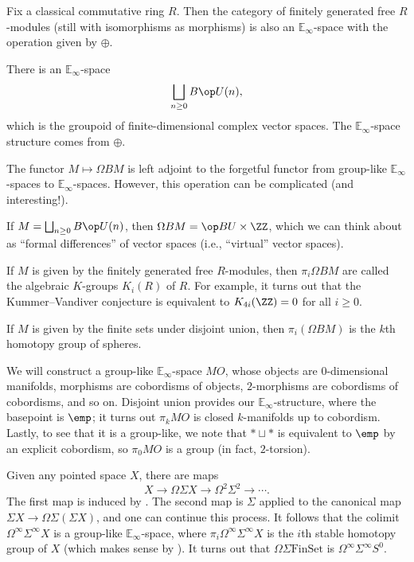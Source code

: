 \documentclass[../notes.tex]{subfiles}
\begin{document}
\begin{example}
	Fix a classical commutative ring $R$. Then the category of finitely generated free $R$-mod\-ules (still with isomorphisms as morphisms) is also an $\mathbb E_\infty$-space with the operation given by $\oplus$.
\end{example}
\begin{example}
	There is an $\mathbb E_\infty$-space
	\[\bigsqcup_{n\ge0}B\op U(n),\]
	which is the groupoid of finite-dimensional complex vector spaces. The $\mathbb E_\infty$-space structure comes from $\oplus$.
\end{example}
\begin{remark}
	The functor $M\mapsto\Omega BM$ is left adjoint to the forgetful functor from group-like $\mathbb E_\infty$-spaces to $\mathbb E_\infty$-spaces. However, this operation can be complicated (and interesting!).
\end{remark}
\begin{example}
	If $M=\bigsqcup_{n\ge0}B\op U(n)$, then $\Omega BM=\op BU\times\ZZ$, which we can think about as ``formal differences'' of vector spaces (i.e., ``virtual'' vector spaces).
\end{example}
\begin{example}
	If $M$ is given by the finitely generated free $R$-modules, then $\pi_i\Omega BM$ are called the algebraic $K$-groups $K_i(R)$ of $R$. For example, it turns out that the Kummer--Vandiver conjecture is equivalent to $K_{4i}(\ZZ)=0$ for all $i\ge0$.
\end{example}
\begin{example}
	If $M$ is given by the finite sets under disjoint union, then $\pi_i(\Omega BM)$ is the $k$th homotopy group of spheres.
\end{example}
\begin{example}
	We will construct a group-like $\mathbb E_\infty$-space $MO$, whose objects are $0$-dimensional manifolds, morphisms are cobordisms of objects, $2$-morphisms are cobordisms of cobordisms, and so on. Disjoint union provides our $\mathbb E_\infty$-structure, where the basepoint is $\emp$; it turns out $\pi_kMO$ is closed $k$-manifolds up to cobordism. Lastly, to see that it is a group-like, we note that $*\sqcup*$ is equivalent to $\emp$ by an explicit cobordism, so $\pi_0MO$ is a group (in fact, $2$-torsion).
\end{example}
\begin{example}
	Given any pointed space $X$, there are maps
	\[X\to\Omega\Sigma X\to\Omega^2\Sigma^2\to\cdots.\]
	The first map is induced by . The second map is $\Sigma$ applied to the canonical map $\Sigma X\to\Omega\Sigma(\Sigma X)$, and one can continue this process. It follows that the colimit $\Omega^\infty\Sigma^\infty X$ is a group-like $\mathbb E_\infty$-space, where $\pi_i\Omega^\infty\Sigma^\infty X$ is the $i$th stable homotopy group of $X$ (which makes sense by ). It turns out that $\Omega\Sigma\mathrm{FinSet}$ is $\Omega^\infty\Sigma^\infty S^0$.
\end{example}
\end{document}
